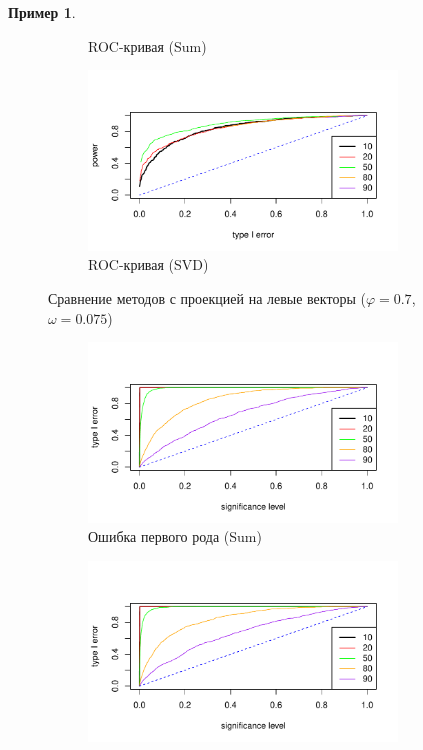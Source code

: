 \documentclass[specialist,
substylefile = spbu_report.rtx,
subf,href,colorlinks=true, 12pt]{disser}
\theoremstyle{definition}
\newtheorem{example}{Пример}
\begin{document}
\begin{example}
\begin{figure}[h!]
\begin{subfigure}[t]{0.5\textwidth}
		\caption{ROC-кривая (Sum)}
		\label{fig:sum_ev_r}
	\end{subfigure}\hspace{\fill}
	\begin{subfigure}[t]{0.5\textwidth}
		\centering
		\includegraphics[width=0.9\textwidth]{img/roc_mssa_ev.pdf}
		\caption{ROC-кривая (SVD)}
	\end{subfigure}
	\caption{Сравнение методов с проекцией на левые векторы ($\varphi=0.7$, $\omega=0.075$)}
	\label{fig:sum_ev}
\end{figure}
\begin{figure}[h!]
	\captionsetup[subfigure]{justification=Centering}
	\begin{subfigure}[t]{0.5\textwidth}
		\centering
		\includegraphics[width=0.9\textwidth]{img/type1error_sum_fa.pdf}
		\caption{Ошибка первого рода (Sum)}
		\label{fig:sum_fa_a}
	\end{subfigure}\hspace{\fill}
	\begin{subfigure}[t]{0.5\textwidth}
		\centering
		\includegraphics[width=0.9\textwidth]{img/type1error_mssa_fa.pdf}

\end{subfigure}
\end{figure}
\end{example}
\end{document}

